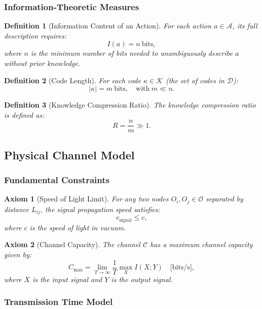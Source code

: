 \documentclass[12pt]{article}
\newtheorem{definition}{Definition}
\newtheorem{axiom}{Axiom}
\begin{document}
	\subsubsection{Information-Theoretic Measures}
	
	\begin{definition}[Information Content of an Action]
		For each action $a \in \mathcal{A}$, its full description requires:
		\[
		I(a) = n \ \text{bits},
		\]
		where $n$ is the minimum number of bits needed to unambiguously describe $a$ without prior knowledge.
	\end{definition}
	
	\begin{definition}[Code Length]
		For each code $\kappa \in \mathcal{K}$ (the set of codes in $\mathcal{D}$):
		\[
		|\kappa| = m \ \text{bits}, \quad \text{with} \ m \ll n.
		\]
	\end{definition}
	
	\begin{definition}[Knowledge Compression Ratio]
		The knowledge compression ratio is defined as:
		\[
		R = \frac{n}{m} \gg 1.
		\]
	\end{definition}
	
	\subsection{Physical Channel Model}
	\label{app:channel-model}
	
	\subsubsection{Fundamental Constraints}
	
	\begin{axiom}[Speed of Light Limit]
		For any two nodes $O_i, O_j \in \mathcal{O}$ separated by distance $L_{ij}$, the signal propagation speed satisfies:
		\[
		v_{\text{signal}} \leq c,
		\]
		where $c$ is the speed of light in vacuum.
	\end{axiom}
	
	\begin{axiom}[Channel Capacity]
		The channel $\mathcal{C}$ has a maximum channel capacity given by:
		\[
		C_{\text{max}} = \lim_{T \to \infty} \frac{1}{T} \max_{X} I(X; Y) \quad \text{[bits/s]},
		\]
		where $X$ is the input signal and $Y$ is the output signal.
	\end{axiom}
	
	\subsubsection{Transmission Time Model}
	
\end{document}
